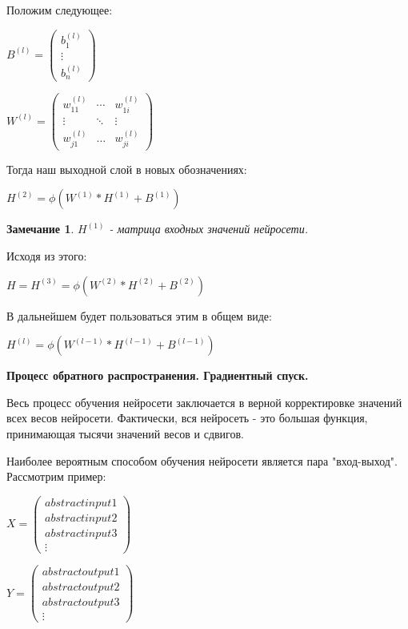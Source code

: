 \documentclass[12pt]{extarticle}
\newtheorem*{remark}{Замечание}
\begin{document}
		
		Положим следующее:
		
		\centerline{$B^{(l)} = \begin{pmatrix}
		b_1^{(l)} \\
		\vdots \\
		b_n^{(l)} \end{pmatrix} $}
		
		\centerline{$W^{(l)} = \begin{pmatrix}
		w_{11}^{(l)} & \cdots & w_{1i}^{(l)} \\ 
		\vdots & \ddots & \vdots \\
		w_{j1}^{(l)} & \dots & w_{ji}^{(l)} \end{pmatrix}$}
		
	Тогда наш выходной слой в новых обозначениях:
	
	
	\centerline{$H^{(2)} =\phi(W^{(1)} * H^{(1)} +  B^{(1)})$}
	
	\begin{remark}
		$H^{(1)}$ - матрица входных значений нейросети.
	\end{remark}
	
	Исходя из этого:
	
	\centerline{$H = H^{(3)} = \phi(W^{(2)} *H^{(2)} +  B^{(2)})$}
	
	В дальнейшем будет пользоваться этим в общем виде:
	
	\centerline{$H^{(l)} =  \phi(W^{(l-1)} * H^{(l-1)}+ B^{(l-1)})$}
	
	
	\centerline{\textbf{Процесс обратного распространения. Градиентный спуск. }}
	
	Весь процесс обучения нейросети заключается в верной корректировке значений всех весов нейросети. Фактически, вся нейросеть - это большая функция, принимающая тысячи значений весов и сдвигов. 
	
	Наиболее вероятным способом обучения нейросети является пара "вход-выход". Рассмотрим пример:
	
	
	\centerline{$X = \begin{pmatrix}
	abstract input 1 \\
	abstract input 2\\
	abstract input 3\\
	\vdots
	\end{pmatrix}$}
	
	\centerline{$Y = \begin{pmatrix}
	abstract output 1 \\
	abstract output 2\\
	abstract output 3\\
	\vdots
	\end{pmatrix}$}
	
\end{document}
